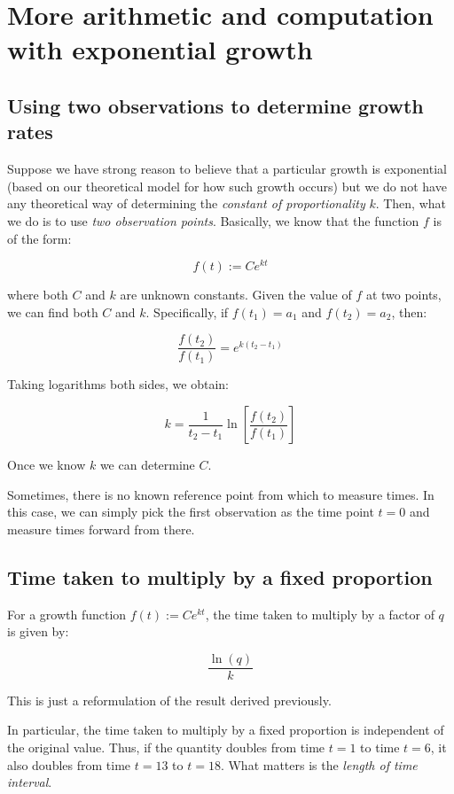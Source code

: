 \documentclass{amsart}
\begin{document}
\section{More arithmetic and computation with exponential growth}

\subsection{Using two observations to determine growth rates}

Suppose we have strong reason to believe that a particular growth is
exponential (based on our theoretical model for how such growth
occurs) but we do not have any theoretical way of determining the {\em
constant of proportionality} $k$. Then, what we do is to use {\em two
observation points}. Basically, we know that the function $f$ is of
the form:

$$f(t) := Ce^{kt}$$

where both $C$ and $k$ are unknown constants. Given the value of $f$
at two points, we can find both $C$ and $k$. Specifically, if $f(t_1)
= a_1$ and $f(t_2) = a_2$, then:

$$\frac{f(t_2)}{f(t_1)} = e^{k(t_2 - t_1)}$$

Taking logarithms both sides, we obtain:

$$k = \frac{1}{t_2 - t_1} \ln\left[\frac{f(t_2)}{f(t_1)}\right]$$

Once we know $k$ we can determine $C$.

Sometimes, there is no known reference point from which to measure
times. In this case, we can simply pick the first observation as the
time point $t = 0$ and measure times forward from there.

\subsection{Time taken to multiply by a fixed proportion}

For a growth function $f(t) := Ce^{kt}$, the time taken to multiply by
a factor of $q$ is given by:

$$\frac{\ln (q)}{k}$$

This is just a reformulation of the result derived previously.

In particular, the time taken to multiply by a fixed proportion is
independent of the original value. Thus, if the quantity doubles from
time $t = 1$ to time $t = 6$, it also doubles from time $t = 13$ to $t
= 18$. What matters is the {\em length of time interval}. 
\end{document}
